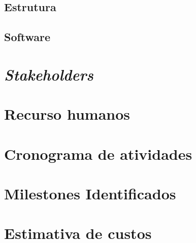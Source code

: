 	\vspace*{\fill}
    \pagebreak
    
\subsection{Estrutura}
\subsection{Software}
\section{\emph{Stakeholders}}
\section{Recurso humanos}
\section{Cronograma de atividades}



\section{Milestones Identificados}
\section{Estimativa de custos}
